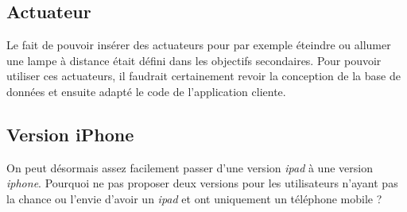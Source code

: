 \subsection{Actuateur} %
\label{sub:actuateur}
Le fait de pouvoir insérer des actuateurs pour par exemple éteindre ou allumer une lampe à distance était défini dans les objectifs secondaires. Pour pouvoir utiliser ces actuateurs, il faudrait certainement revoir la conception de la base de données et ensuite adapté le code de l'application cliente.

\subsection{Version iPhone} %
\label{sub:version_iphone}
On peut désormais assez facilement passer d'une version \emph{\gls{ipad}} à une version \emph{\gls{iphone}}. Pourquoi ne pas proposer deux versions pour les utilisateurs n'ayant pas la chance ou l'envie d'avoir un \emph{\gls{ipad}} et ont uniquement un téléphone mobile ?




